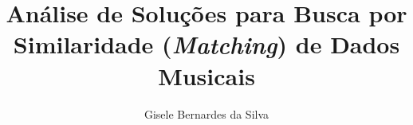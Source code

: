 \sloppy

\title{Análise de Soluções para Busca por Similaridade (\textit{Matching}) de Dados Musicais}

\author{Gisele Bernardes da Silva}


\address{Departamento de Informática e Estatística -- Universidade Federal de Santa Catarina
  (UFSC)\\
  Caixa Postal 476 -- 88.045-108 -- Florianópolis -- SC -- Brazil
}